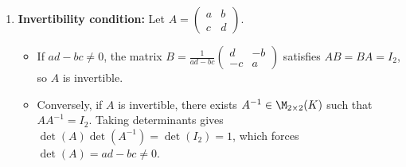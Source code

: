 \begin{exercisesolution}
\label{sol:invertibility_nilpotency_2x2}
\begin{enumerate}[label=\textbf{(\alph*)}]
    \item \textbf{Invertibility condition:}
    Let $A = \left(\begin{smallmatrix} a & b \\ c & d \end{smallmatrix}\right)$.
    \begin{itemize}
        \item If $ad - bc \ne 0$, the matrix $B = \frac{1}{ad-bc} \left(\begin{smallmatrix} d & -b \\ -c & a \end{smallmatrix}\right)$ satisfies $AB = BA = I_2$, so $A$ is invertible.
        \item Conversely, if $A$ is invertible, there exists $A^{-1} \in \M_{2 \times 2}(K)$ such that $A A^{-1} = I_2$. Taking determinants gives $\det(A) \det(A^{-1}) = \det(I_2) = 1$, which forces $\det(A) = ad - bc \ne 0$.
    \end{itemize}


\end{enumerate}
\end{exercisesolution}
